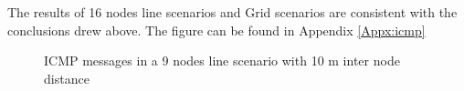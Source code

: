 The results of 16 nodes line scenarios and Grid scenarios are consistent with the conclusions drew above. The figure can be found in Appendix \ref{Appx:icmp}
  
\begin{figure}[htbp]
  \begin{center}
  	\hspace{-20pt}
    \leavevmode
       \hspace{-30pt}
    \caption{ICMP messages in a 9 nodes line scenario with 10 m inter node distance}
    \label{fig:9_MRHOF_line_10_icmp}
  \end{center}
\end{figure}

